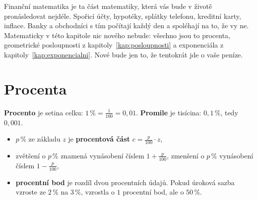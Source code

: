 \label{kap:financni}

Finanční matematika je ta část matematiky, která vás bude v životě pronásledovat nejdéle. Spořicí účty, hypotéky, splátky telefonu, kreditní karty, inflace. Banky a obchodníci s tím počítají každý den a spoléhají na to, že vy ne. Matematicky v této kapitole nic nového nebude: všechno jsou to procenta, geometrické posloupnosti z kapitoly~\ref{kap:posloupnosti} a exponenciála z kapitoly~\ref{kap:exponencialni}. Nové bude jen to, že tentokrát jde o vaše peníze.

\section{Procenta}\label{sec:procenta}

\begin{definitionbox}
  \textbf{Procento} je setina celku: $1\,\% = \frac{1}{100} = 0{,}01$. \textbf{Promile} je tisícina: $0{,}1\,\%$, tedy $0{,}001$.

  \vspace{0.2cm}

  \begin{itemize}
    \item $p\,\%$ ze základu $z$ je \textbf{procentová část} $c = \frac{p}{100}\cdot z$,
    \item zvětšení o $p\,\%$ znamená vynásobení číslem $1 + \frac{p}{100}$, zmenšení o $p\,\%$ vynásobení číslem $1 - \frac{p}{100}$,
    \item \textbf{procentní bod} je rozdíl dvou procentních údajů. Pokud úroková sazba vzroste ze $2\,\%$ na $3\,\%$, vzrostla o $1$ procentní bod, ale o $50\,\%$.
  \end{itemize}
\end{definitionbox}

